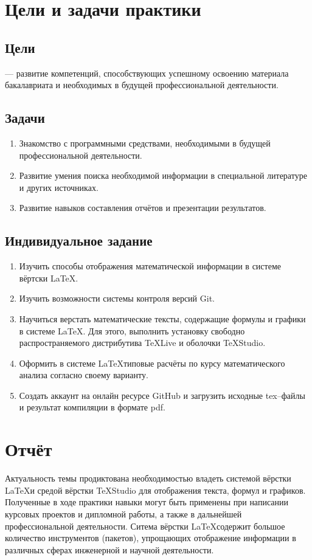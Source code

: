 \documentclass[12pt]{article}
\begin{document}
	\section{Цели и задачи практики}	
	\subsection{Цели}
	--- развитие компетенций, способствующих успешному освоению материала бакалавриата и необходимых в будущей профессиональной деятельности.
	\subsection{Задачи}
	\begin{enumerate}
		\item Знакомство с программными средствами, необходимыми в будущей профессиональной деятельности.
		\item Развитие умения поиска необходимой информации в специальной литературе и других источниках.
		\item Развитие навыков составления отчётов и презентации результатов.
	\end{enumerate}
	\subsection{Индивидуальное задание}	
	\begin{enumerate}
		\item Изучить способы отображения математической информации в системе вёртски \LaTeX.
		\item Изучить возможности  системы контроля версий \textsf{Git}.
		\item Научиться верстать математические тексты, содержащие формулы и графики в системе \LaTeX.
		Для этого, выполнить установку свободно распространяемого дистрибутива \textsf{TeXLive} и оболочки \textsf{TeXStudio}.
		\item Оформить в системе \LaTeX типовые расчёты по курсу математического анализа согласно своему варианту.
		\item Создать аккаунт на онлайн ресурсе \textsf{GitHub} и загрузить исходные \textsf{tex}--файлы 
		и результат компиляции в формате \textsf{pdf}.
	\end{enumerate} 
	\newpage
	\section{Отчёт}
	Актуальность темы продиктована необходимостью владеть системой вёрстки \LaTeX и средой вёрстки \textsf{TeXStudio} для
	отображения текста, формул и графиков. Полученные в ходе практики навыки могут быть применены при написании
	курсовых проектов и дипломной работы, а также в дальнейшей профессиональной деятельности.
	Ситема вёрстки \LaTeX содержит большое количество инструментов (пакетов), упрощающих отображение информации в различных 
	сферах инженерной и научной деятельности. 
	\newpage
\end{document}

